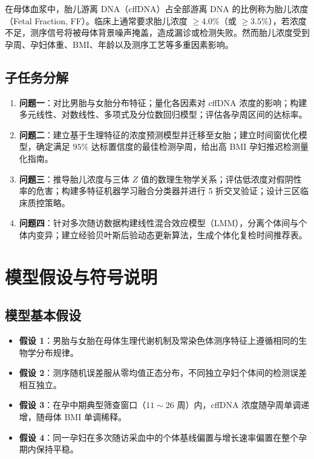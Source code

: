 ﻿\documentclass[12pt,a4paper]{article}
\begin{document}
在母体血浆中，胎儿游离 DNA（cffDNA）占全部游离 DNA 的比例称为胎儿浓度（Fetal Fraction, FF）。临床上通常要求胎儿浓度 $\ge 4.0\%$（或 $\ge 3.5\%$），若浓度不足，测序信号将被母体背景噪声掩盖，造成漏诊或检测失败。然而胎儿浓度受到孕周、孕妇体重、BMI、年龄以及测序工艺等多重因素影响。


\subsection{子任务分解}
\begin{enumerate}
    \item \textbf{问题一}：对比男胎与女胎分布特征；量化各因素对 cffDNA 浓度的影响；构建多元线性、对数线性、多项式及分位数回归模型；评估各孕周区间的达标率。
    \item \textbf{问题二}：建立基于生理特征的浓度预测模型并迁移至女胎；建立时间窗优化模型，确定满足 $95\%$ 达标置信度的最佳检测孕周，给出高 BMI 孕妇推迟检测量化指南。
    \item \textbf{问题三}：推导胎儿浓度与三体 $Z$ 值的数理生物学关系；评估低浓度对假阴性率的危害；构建多特征机器学习融合分类器并进行 5 折交叉验证；设计三区临床质控策略。
    \item \textbf{问题四}：针对多次随访数据构建线性混合效应模型（LMM），分离个体间与个体内变异；建立经验贝叶斯后验动态更新算法，生成个体化复检时间推荐表。
\end{enumerate}


\section{模型假设与符号说明}


\subsection{模型基本假设}
\begin{itemize}
    \item \textbf{假设 1}：男胎与女胎在母体生理代谢机制及常染色体测序特征上遵循相同的生物学分布规律。
    \item \textbf{假设 2}：测序随机误差服从零均值正态分布，不同独立孕妇个体间的检测误差相互独立。
    \item \textbf{假设 3}：在孕中期典型筛查窗口（$11\sim 26$ 周）内，cffDNA 浓度随孕周单调递增，随母体 BMI 单调稀释。
    \item \textbf{假设 4}：同一孕妇在多次随访采血中的个体基线偏置与增长速率偏置在整个孕期内保持平稳。
\end{itemize}
\end{document}
